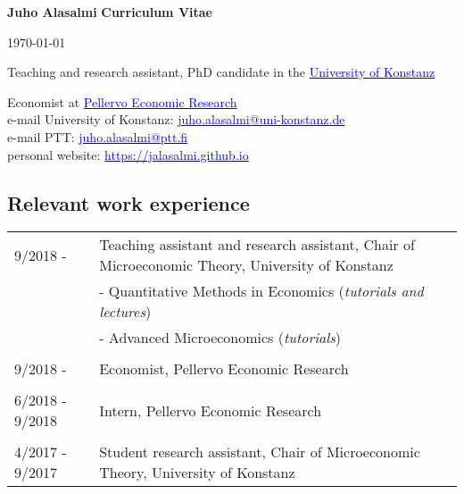 \documentclass[16pt]{article}
\begin{document}
\noindent \textbf{Juho Alasalmi} \hfill{\textbf{Curriculum Vitae}} \par
\noindent  \hfill{\today} \par
\noindent Teaching and research assistant, PhD candidate in the \href{https://www.wiwi.uni-konstanz.de/goldluecke/team/academic-staff/doctoral-students/}{\textcolor{blue}{University of Konstanz}} \par
\noindent Economist at \href{http://www.ptt.fi/}{\textcolor{blue}{Pellervo Economic Research}} \\

\noindent e-mail University of Konstanz: \href{mailto: juho.alasalmi@uni-konstanz.de}{\textcolor{blue}{juho.alasalmi@uni-konstanz.de}} \\
\noindent e-mail PTT: \href{mailto: juho.alasalmi@ptt.fi}{\textcolor{blue}{juho.alasalmi@ptt.fi}}\\
\noindent personal website: \href{https://jalasalmi.github.io}{\textcolor{blue}{https://jalasalmi.github.io}}

\subsection*{Relevant work experience}
\begin{tabular}{@{}p{1.5in}p{5in}}
9/2018 -            & Teaching assistant and research assistant, Chair of Microeconomic Theory,  University of Konstanz \\
                          &   -  Quantitative Methods in Economics (\textit{tutorials and lectures}) \\
                          &   -  Advanced Microeconomics (\textit{tutorials}) \\   
                                                 
\\
9/2018 -            & Economist, Pellervo Economic Research\\

\\
6/2018 - 9/2018 & Intern, Pellervo Economic Research\\

\\
4/2017 - 9/2017 & Student research assistant, Chair of Microeconomic Theory,  University of Konstanz\\
                           
\end{tabular}
\end{document}
